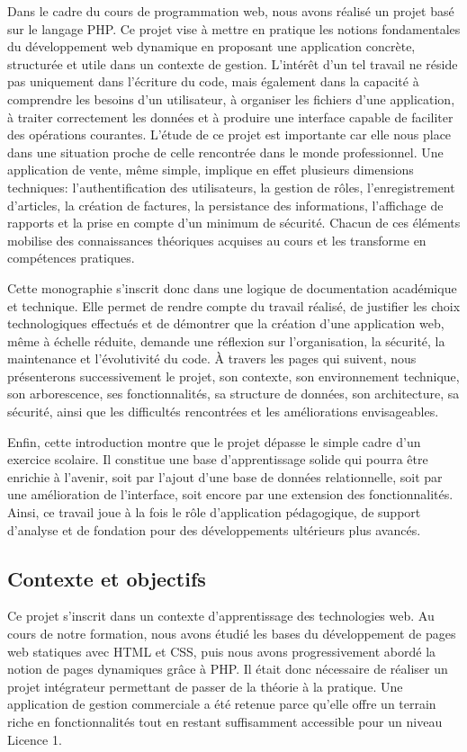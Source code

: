 \documentclass[12pt,a4paper]{article}
\begin{document}
Dans le cadre du cours de programmation web, nous avons réalisé un projet basé sur le langage PHP. Ce projet vise à mettre en pratique les notions fondamentales du développement web dynamique en proposant une application concrète, structurée et utile dans un contexte de gestion. L'intérêt d'un tel travail ne réside pas uniquement dans l'écriture du code, mais également dans la capacité à comprendre les besoins d'un utilisateur, à organiser les fichiers d'une application, à traiter correctement les données et à produire une interface capable de faciliter des opérations courantes.
L'étude de ce projet est importante car elle nous place dans une situation proche de celle rencontrée dans le monde professionnel. Une application de vente, même simple, implique en effet plusieurs dimensions techniques: l'authentification des utilisateurs, la gestion de rôles, l'enregistrement d'articles, la création de factures, la persistance des informations, l'affichage de rapports et la prise en compte d'un minimum de sécurité. Chacun de ces éléments mobilise des connaissances théoriques acquises au cours et les transforme en compétences pratiques.

Cette monographie s'inscrit donc dans une logique de documentation académique et technique. Elle permet de rendre compte du travail réalisé, de justifier les choix technologiques effectués et de démontrer que la création d'une application web, même à échelle réduite, demande une réflexion sur l'organisation, la sécurité, la maintenance et l'évolutivité du code. À travers les pages qui suivent, nous présenterons successivement le projet, son contexte, son environnement technique, son arborescence, ses fonctionnalités, sa structure de données, son architecture, sa sécurité, ainsi que les difficultés rencontrées et les améliorations envisageables.

Enfin, cette introduction montre que le projet dépasse le simple cadre d'un exercice scolaire. Il constitue une base d'apprentissage solide qui pourra être enrichie à l'avenir, soit par l'ajout d'une base de données relationnelle, soit par une amélioration de l'interface, soit encore par une extension des fonctionnalités. Ainsi, ce travail joue à la fois le rôle d'application pédagogique, de support d'analyse et de fondation pour des développements ultérieurs plus avancés.
\subsection{Contexte et objectifs}
Ce projet s'inscrit dans un contexte d'apprentissage des technologies web. Au cours de notre formation, nous avons étudié les bases du développement de pages web statiques avec HTML et CSS, puis nous avons progressivement abordé la notion de pages dynamiques grâce à PHP. Il était donc nécessaire de réaliser un projet intégrateur permettant de passer de la théorie à la pratique. Une application de gestion commerciale a été retenue parce qu'elle offre un terrain riche en fonctionnalités tout en restant suffisamment accessible pour un niveau Licence 1.
\end{document}
